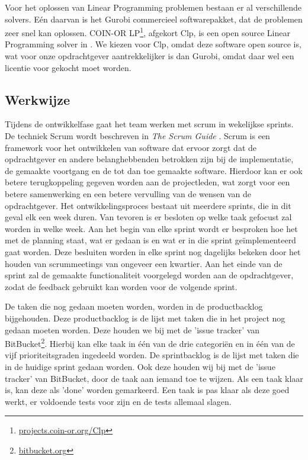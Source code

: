 Voor het oplossen van Linear Programming problemen bestaan er al verschillende solvers. E\'en daarvan is het Gurobi commercieel softwarepakket, dat de problemen zeer snel kan oplossen. COIN-OR LP\footnote{\href{http://projects.coin-or.org/Clp}{projects.coin-or.org/Clp}}, afgekort Clp, is een open source Linear Programming solver in \cpp . We kiezen voor Clp, omdat deze software open source is, wat voor onze opdrachtgever aantrekkelijker is dan Gurobi, omdat daar wel een licentie voor gekocht moet worden.

\subsection{Werkwijze}
Tijdens de ontwikkelfase gaat het team werken met scrum in wekelijkse sprints. De techniek Scrum wordt beschreven in \emph{The Scrum Guide} \cite{schwaber2011}. Scrum is een framework voor het ontwikkelen van software dat ervoor zorgt dat de opdrachtgever en andere belanghebbenden betrokken zijn bij de implementatie, de gemaakte voortgang en de tot dan toe gemaakte software. Hierdoor kan er ook betere terugkoppeling gegeven worden aan de projectleden, wat zorgt voor een betere samenwerking en een betere vervulling van de wensen van de opdrachtgever. Het ontwikkelingsproces bestaat uit meerdere sprints, die in dit geval elk een week duren. Van tevoren is er besloten op welke taak gefocust zal worden in welke week. Aan het begin van elke sprint wordt er besproken hoe het met de planning staat, wat er gedaan is en wat er in die sprint ge\"implementeerd gaat worden. Deze besluiten worden in elke sprint nog dagelijks bekeken door het houden van scrummeetings van ongeveer een kwartier. Aan het einde van de sprint zal de gemaakte functionaliteit voorgelegd worden aan de opdrachtgever, zodat de feedback gebruikt kan worden voor de volgende sprint. 

De taken die nog gedaan moeten worden, worden in de productbacklog bijgehouden. Deze productbacklog is de lijst met taken die in het project nog gedaan moeten worden. Deze houden we bij met de 'issue tracker' van BitBucket\footnote{\href{http://bitbucket.org}{bitbucket.org}}. Hierbij kan elke taak in \'e\'en van de drie categori\"en en in \'e\'en van de vijf prioriteitsgraden ingedeeld worden. De sprintbacklog is de lijst met taken die in de huidige sprint gedaan worden. Ook deze houden wij bij met de 'issue tracker' van BitBucket, door de taak aan iemand toe te wijzen. Als een taak klaar is, kan deze als 'done' worden gemarkeerd. Een taak is pas klaar als deze goed werkt, er voldoende tests voor zijn en de tests allemaal slagen.


